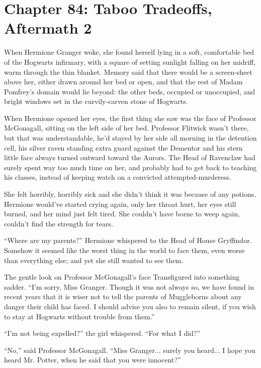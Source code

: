 \chapter{Chapter 84: Taboo Tradeoffs, Aftermath 2}
When Hermione Granger woke, she found herself lying in a soft,
comfortable bed of the Hogwarts infirmary, with a square of setting
sunlight falling on her midriff, warm through the thin blanket. Memory
said that there would be a screen-sheet above her, either drawn around
her bed or open, and that the rest of Madam Pomfrey's domain would lie
beyond: the other beds, occupied or unoccupied, and bright windows set
in the curvily-carven stone of Hogwarts.

When Hermione opened her eyes, the first thing she saw was the face of
Professor McGonagall, sitting on the left side of her bed. Professor
Flitwick wasn't there, but that was understandable, he'd stayed by her
side all morning in the detention cell, his silver raven standing extra
guard against the Dementor and his stern little face always turned
outward toward the Aurors. The Head of Ravenclaw had surely spent way
too much time on her, and probably had to get back to teaching his
classes, instead of keeping watch on a convicted attempted-murderess.

She felt horribly, horribly sick and she didn't think it was because of
any potions. Hermione would've started crying again, only her throat
hurt, her eyes still burned, and her mind just felt tired. She couldn't
have borne to weep again, couldn't find the strength for tears.

``Where are my parents?'' Hermione whispered to the Head of House
Gryffindor. Somehow it seemed like the worst thing in the world to face
them, even worse than everything else; and yet she still wanted to see
them.

The gentle look on Professor McGonagall's face Transfigured into
something sadder. ``I'm sorry, Miss Granger. Though it was not always
so, we have found in recent years that it is wiser not to tell the
parents of Muggleborns about any danger their child has faced. I should
advise you also to remain silent, if you wish to stay at Hogwarts
without trouble from them.''

``I'm not being expelled?'' the girl whispered. ``For what I did?''

``No,'' said Professor McGonagall. ``Miss Granger... surely you
heard... I hope you heard Mr. Potter, when he said that you were
innocent?''

